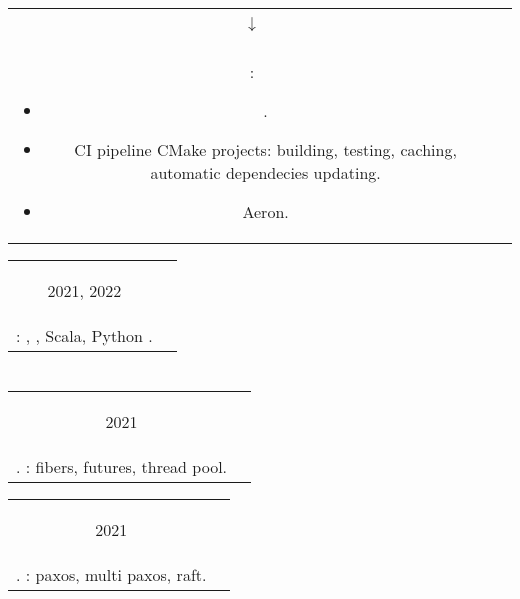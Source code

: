 \documentclass{article}
\newif\ifen
\newif\ifru
\newcommand{\en}[1]{\ifen#1\fi}
\newcommand{\ru}[1]{\ifru#1\fi}
\newcommand{\entry}[3]{
	\begin{tabular}{ c | c }
    \begin{minipage}{0.05\linewidth}
    	\begin{center}
    		#1
    	\end{center}
    \end{minipage} 
    &
    \begin{minipage}{0.85\linewidth}
        \textbf{#2} \\ \footnotesize{#3}
    \end{minipage}
    \end{tabular}
}
\newcommand{\interval}[2]{
	#1 \\ $\downarrow$ \\ #2
}
\begin{document}
        \entry {\interval{\ru{Авг.}\en{Aug.} 2022}{\ru{н.в.}\en{today}}}
        {Mosaic Research - Crypto HFT - Backend \ru{разработчик}\en{Engineer}}
        {\ru{Бэкенд разработка на C\texttt{++}}\en{Backend C\texttt{++} development}: 
        	\begin{itemize}
        		\item \ru{Разработка и поддержка инфраструктуры для торговли криптовалютами} \en{Development and maintenance of infrastructure for crypto trading}.
        		\item \ru{Создание}\en{Setting up} CI pipeline \ru{для}\en{for} CMake projects: building, testing, caching, automatic dependecies updating.
        		\item \ru{Имплементация протокола коммуникации между компонентами с использованием} \en{Implementing microservices communication protocol with} Aeron.
        	\end{itemize}
        }
        
        \vspace{.1cm}
        
        \entry {2021, 2022}
        {\ru{Летняя Школа Слон в Пущино}\en{Summer School <<Slon>> in Pushchino} - \ru{Волонтер-Преподаватель}\en{Volunteer-Tutor}}
        {\ru{Проведение курсов}\en{Courses taught}: \ru{Формальные языки}\en{Formal languages}, \ru{Математическая логика}\en{Mathematical logic}, \ru{ФП в }\en{FP in} Scala, Python \ru{с нуля}\en{from scratch}.
    	}  

    \section{\ru{Курсы}}
    \entry {2021
        }
        {\ru{МФТИ}\en{MIPT} - \ru{Теория и практика многопоточной синхронизации}\en{Concurrency course} }
        {\ru{Язык C\texttt{++}}\en{C\texttt{++}}. \ru{Реализация библиотеки для работы с многопоточностью}\en{Implementation of simple concurrency library}: fibers, futures, thread pool.  }
    
    \vspace{.1cm}
    
    \entry {2021
        }
        {\ru{МФТИ}\en{MIPT} - \ru{Распределенные системы}\en{Distributed systems} }
        {\ru{Язык C\texttt{++}}\en{C\texttt{++}}. \ru{Реализация алгоритмов распределенных консенсуса и репликации}\en{Implementation of distributed consensus and replication algorithms}: paxos, multi paxos, raft.  }
    
    \vspace{.1cm}
    
\end{document}
